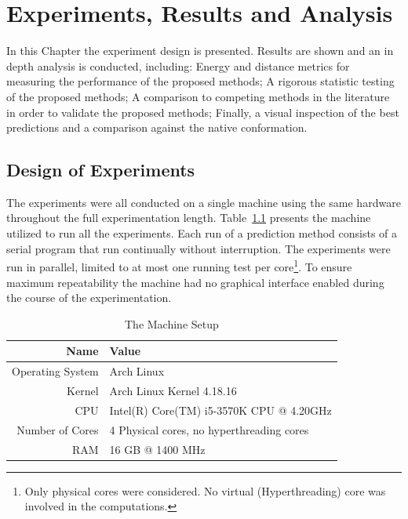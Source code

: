 \chapter{Experiments, Results and Analysis}\label{chap:experiments_and_results}

In this Chapter the experiment design is presented. Results are shown and an in depth analysis is conducted, including: Energy and distance metrics for measuring the performance
of the proposed methods; A rigorous statistic testing of the proposed methods; A comparison to competing methods in the literature in
order to validate the proposed methods; Finally, a visual inspection of the best predictions
and a comparison against the native conformation.

\section{Design of Experiments}\label{sec:design_of_experiments}

The experiments were all conducted on a single machine using the same hardware
throughout the full experimentation length. Table~\ref{tab:machine-setup} presents
the machine utilized to run all the experiments. Each run of a prediction method
consists of a serial program that run continually without interruption.
The experiments were run in parallel, limited to at most one running test
per core\footnote{Only physical cores were considered. No virtual (Hyperthreading) core was
involved in the computations.}.
To ensure maximum repeatability the machine had no graphical interface enabled during the course of the experimentation.

\begin{table}[th]
    \centering
    \begin{tabular}{r|l} \hline \hline
        Name & Value \\ \hline \hline
        Operating System & Arch Linux \\ \hline
        Kernel &  Arch Linux Kernel 4.18.16 \\ \hline
        CPU & Intel(R) Core(TM) i5-3570K CPU @ 4.20GHz \\ \hline
        Number of Cores & 4 Physical cores, no hyperthreading cores \\ \hline
        RAM & 16 GB @ 1400 MHz \\ \hline \hline
    \end{tabular}
    \caption{The Machine Setup}
    \label{tab:machine-setup}
\end{table}


